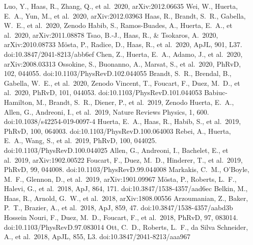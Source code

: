 \documentclass[11pt,a4paper,roman]{moderncv}        %
\newcommand\apj{\textrm{ApJ}}%
\newcommand\apjl{\textrm{ApJL}}     %
\newcommand\prd{\textrm{PhRvD}}%
\begin{document}
\begin{thebibliography}{99}
 Luo, Y., Haas, R., Zhang, Q., et al.\ 2020, arXiv:2012.06635
 Wei, W., Huerta, E.~A., Yun, M., et al.\ 2020, arXiv:2012.03963
 Haas, R., Brandt, S.~R., Gabella, W.~E., et al.\ 2020, Zenodo
 Habib, S., Ramos-Buades, A., Huerta, E.~A., et al.\ 2020, arXiv:2011.08878
 Tsao, B.-J., Haas, R., \& Tsokaros, A.\ 2020, arXiv:2010.08733
 M{\"o}sta, P., Radice, D., Haas, R., et al.\ 2020, \apjl, 901, L37. doi:10.3847/2041-8213/abb6ef
 Chen, Z., Huerta, E.~A., Adamo, J., et al.\ 2020, arXiv:2008.03313
 Ossokine, S., Buonanno, A., Marsat, S., et al.\ 2020, \prd, 102, 044055. doi:10.1103/PhysRevD.102.044055
 Brandt, S.~R., Brendal, B., Gabella, W.~E., et al.\ 2020, Zenodo
 Vincent, T., Foucart, F., Duez, M.~D., et al.\ 2020, \prd, 101, 044053. doi:10.1103/PhysRevD.101.044053
 Babiuc-Hamilton, M., Brandt, S.~R., Diener, P., et al.\ 2019, Zenodo
 Huerta, E.~A., Allen, G., Andreoni, I., et al.\ 2019, Nature Reviews Physics, 1, 600. doi:10.1038/s42254-019-0097-4
 Huerta, E.~A., Haas, R., Habib, S., et al.\ 2019, \prd, 100, 064003. doi:10.1103/PhysRevD.100.064003
 Rebei, A., Huerta, E.~A., Wang, S., et al.\ 2019, \prd, 100, 044025. doi:10.1103/PhysRevD.100.044025
 Allen, G., Andreoni, I., Bachelet, E., et al.\ 2019, arXiv:1902.00522
 Foucart, F., Duez, M.~D., Hinderer, T., et al.\ 2019, \prd, 99, 044008. doi:10.1103/PhysRevD.99.044008
 Markakis, C.~M., O'Boyle, M.~F., Glennon, D., et al.\ 2019, arXiv:1901.09967
 M{\"o}sta, P., Roberts, L.~F., Halevi, G., et al.\ 2018, \apj, 864, 171. doi:10.3847/1538-4357/aad6ec
 Belkin, M., Haas, R., Arnold, G.~W., et al.\ 2018, arXiv:1808.00556
 Arzoumanian, Z., Baker, P.~T., Brazier, A., et al.\ 2018, \apj, 859, 47. doi:10.3847/1538-4357/aabd3b
 Hossein Nouri, F., Duez, M.~D., Foucart, F., et al.\ 2018, \prd, 97, 083014. doi:10.1103/PhysRevD.97.083014
 Ott, C.~D., Roberts, L.~F., da Silva Schneider, A., et al.\ 2018, \apjl, 855, L3. doi:10.3847/2041-8213/aaa967

\end{thebibliography}
\end{document}
